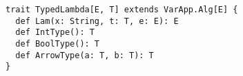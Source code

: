 \begin{lstlisting}
trait TypedLambda[E, T] extends VarApp.Alg[E] {
  def Lam(x: String, t: T, e: E): E
  def IntType(): T
  def BoolType(): T
  def ArrowType(a: T, b: T): T
}
\end{lstlisting}



